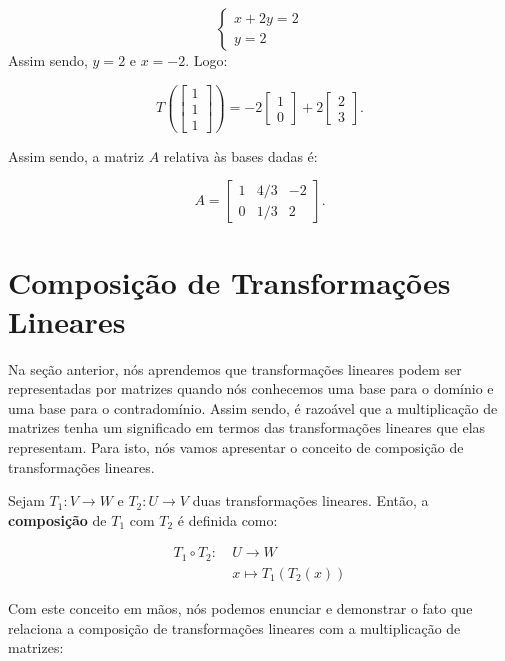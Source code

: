 \begin{Example}
	$$
	\begin{cases}
		x + 2y = 2 \\
		y = 2
	\end{cases}
	$$
	Assim sendo, $y = 2$ e $x = -2$. Logo:
	
	$$
	T\left(\begin{bmatrix}
		1 \\
		1 \\
		1
	\end{bmatrix}\right) = -2\begin{bmatrix}
		1 \\
		0
	\end{bmatrix} + 2\begin{bmatrix}
		2 \\
		3
	\end{bmatrix}.
	$$
	
	Assim sendo, a matriz $A$ relativa às bases dadas é:
	
	$$
	A = \begin{bmatrix}
		1 & 4/3 & -2 \\
		0 & 1/3 & 2
	\end{bmatrix}.
	$$
\end{Example}

\section{Composição de Transformações Lineares}

Na seção anterior, nós aprendemos que transformações lineares podem ser representadas por matrizes quando nós conhecemos uma base para o domínio e uma base para o contradomínio. Assim sendo, é razoável que a multiplicação de matrizes tenha um significado em termos das transformações lineares que elas representam. Para isto, nós vamos apresentar o conceito de composição de transformações lineares.

\begin{Definition}
	Sejam $T_1:V\to W$ e $T_2:U\to V$ duas transformações lineares. Então, a \textbf{composição} de $T_1$ com $T_2$ é definida como:
	
	\begin{align*}
		T_1\circ T_2: ~&U\to W \\
		&x\mapsto T_1(T_2(x))
	\end{align*}
\end{Definition}

Com este conceito em mãos, nós podemos enunciar e demonstrar o fato que relaciona a composição de transformações lineares com a multiplicação de matrizes:

